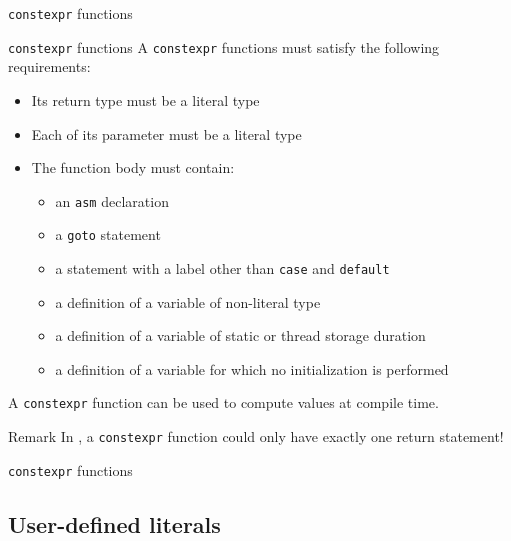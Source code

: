 \begin{frame}{\texttt{constexpr} functions}{}
  \begin{block}{\texttt{constexpr} functions}
    A \lstinline!constexpr! functions must satisfy the following requirements:
    \begin{itemize}
    \item
      Its return type must be a literal type
    \item
      Each of its parameter must be a literal type
    \item
      The function body must  contain:
      \begin{itemize}
      \item
        an \lstinline!asm! declaration
      \item
        a \lstinline!goto! statement
      \item
        a statement with a label other than \lstinline!case! and \lstinline!default!
      \item
        a definition of a variable of non-literal type
      \item
        a definition of a variable of static or thread storage duration
      \item
        a definition of a variable for which no initialization is performed
      \end{itemize}
    \end{itemize}

    A \lstinline!constexpr! function can be used to compute values at compile time.
  \end{block}

  \begin{block}{Remark}
    In , a \lstinline!constexpr! function could only have exactly one return statement!
  \end{block}
\end{frame}

\begin{frame}{\texttt{constexpr} functions}{}
  \begin{example}
  \end{example}
\end{frame}


\subsection{User-defined literals}


